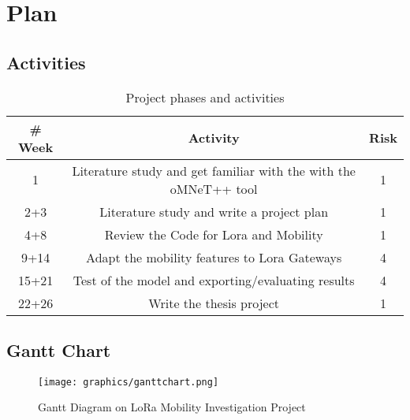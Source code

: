 \chapter{Plan}


\section{Activities}

\begin{table}[h!]
\centering
\begin{tabular}{|| c | c | c ||} 
 \hline
 \hline
 \# Week & Activity & Risk \\ [0.5ex] 
 \hline\hline
 1 & Literature study and get familiar with the with the oMNeT++ tool & 1 \\ 
 2+3 & Literature study and write a project plan & 1  \\
 4+8 & Review the Code for Lora and Mobility & 1  \\
 9+14 & Adapt the mobility features to Lora Gateways & 4\\
 15+21 & Test of the model and exporting/evaluating results & 4  \\ 
 22+26 & Write the thesis project & 1  \\ [1ex] 
 \hline
 \hline
\end{tabular}
\caption{Project phases and activities}
\label{table:1}
\end{table}

\section{Gantt Chart}
\begin{figure}
    \centering
        \texttt{[image: graphics/ganttchart.png]}
    \caption{Gantt Diagram on LoRa Mobility Investigation Project}
    \label{myFigure}
\end{figure}



